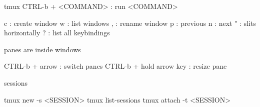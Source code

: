 \documentclass[twocolumn]{article}
\begin{document}
tmux
CTRL-b + <COMMAND> : run <COMMAND>

c : create window
w : list windows
, : rename window
p : previous
n : next
" : slits horizontally
? : list all keybindings

panes are inside windows

CTRL-b + arrow : switch panes
CTRL-b + hold arrow key : resize pane


sessions

tmux new -s <SESSION>
tmux list-sessions
tmux attach -t <SESSION>
\end{document}
